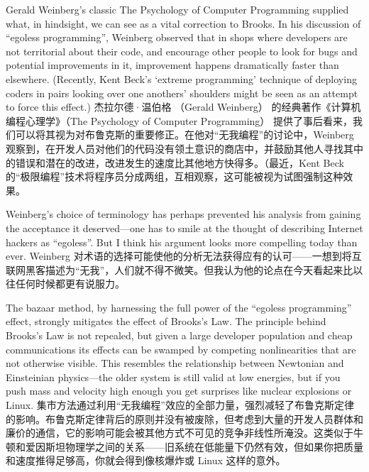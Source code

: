 \documentclass[a4paper,12pt,UTF8,twoside]{ctexbook}
\begin{document}
Gerald Weinberg's classic The Psychology of Computer Programming supplied what, in hindsight, we can see as a vital correction to Brooks. In his discussion of ``egoless programming'', Weinberg observed that in shops where developers are not territorial about their code, and encourage other people to look for bugs and potential improvements in it, improvement happens dramatically faster than elsewhere. (Recently, Kent Beck's `extreme programming' technique of deploying coders in pairs looking over one anothers' shoulders might be seen as an attempt to force this effect.)
杰拉尔德·温伯格 （Gerald Weinberg） 的经典著作《计算机编程心理学》（The Psychology of Computer Programming） 提供了事后看来，我们可以将其视为对布鲁克斯的重要修正。在他对“无我编程”的讨论中，Weinberg 观察到，在开发人员对他们的代码没有领土意识的商店中，并鼓励其他人寻找其中的错误和潜在的改进，改进发生的速度比其他地方快得多。（最近，Kent Beck 的“极限编程”技术将程序员分成两组，互相观察，这可能被视为试图强制这种效果。

Weinberg's choice of terminology has perhaps prevented his analysis from gaining the acceptance it deserved—one has to smile at the thought of describing Internet hackers as ``egoless''. But I think his argument looks more compelling today than ever.
Weinberg 对术语的选择可能使他的分析无法获得应有的认可——一想到将互联网黑客描述为“无我”，人们就不得不微笑。但我认为他的论点在今天看起来比以往任何时候都更有说服力。

The bazaar method, by harnessing the full power of the ``egoless programming'' effect, strongly mitigates the effect of Brooks's Law. The principle behind Brooks's Law is not repealed, but given a large developer population and cheap communications its effects can be swamped by competing nonlinearities that are not otherwise visible. This resembles the relationship between Newtonian and Einsteinian physics—the older system is still valid at low energies, but if you push mass and velocity high enough you get surprises like nuclear explosions or Linux.
集市方法通过利用“无我编程”效应的全部力量，强烈减轻了布鲁克斯定律的影响。布鲁克斯定律背后的原则并没有被废除，但考虑到大量的开发人员群体和廉价的通信，它的影响可能会被其他方式不可见的竞争非线性所淹没。这类似于牛顿和爱因斯坦物理学之间的关系——旧系统在低能量下仍然有效，但如果你把质量和速度推得足够高，你就会得到像核爆炸或 Linux 这样的意外。
\end{document}
